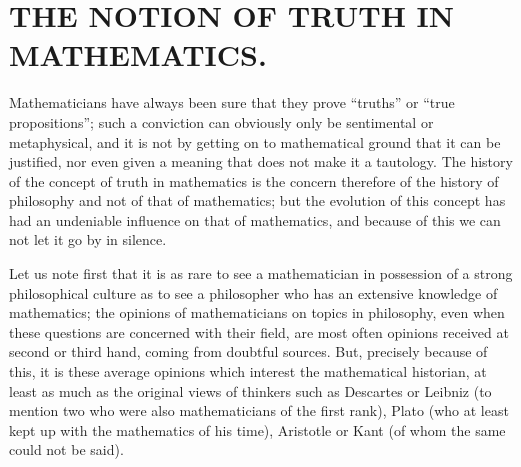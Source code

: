 \section*{THE NOTION OF TRUTH IN MATHEMATICS.}
{}

Mathematicians have always been sure that they prove ``truths'' or ``true propositions''; such a conviction can obviously only be sentimental or metaphysical, and it is not by getting on to mathematical ground that it can be justified, nor even given a meaning that does not make it a tautology. The history of the concept of truth in mathematics is the concern therefore of the history of philosophy and not of that of mathematics; but the evolution of this concept has had an undeniable influence on that of mathematics, and because of this we can not let it go by in silence.

Let us note first that it is as rare to see a mathematician in possession of a strong philosophical culture as to see a philosopher who has an extensive knowledge of mathematics; the opinions of mathematicians on topics in philosophy, even when these questions are concerned with their field, are most often opinions received at second or third hand, coming from doubtful sources. But, precisely because of this, it is these average opinions which interest the mathematical historian, at least as much as the original views of thinkers such as Descartes or Leibniz (to mention two who were also mathematicians of the first rank), Plato (who at least kept up with the mathematics of his time), Aristotle or Kant (of whom the same could not be said).

